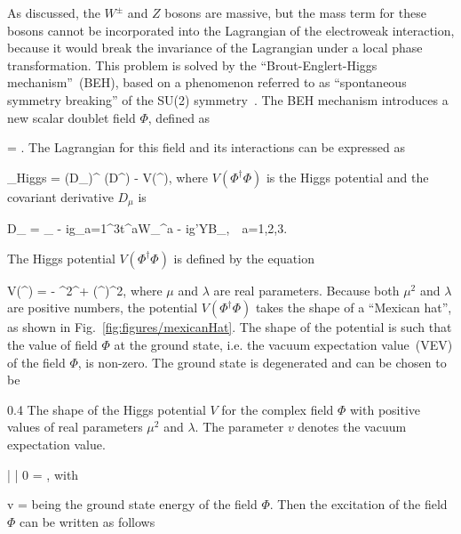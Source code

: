 As discussed, the $W^{\pm}$ and $Z$ bosons are massive, but the mass term for these bosons cannot be incorporated into the Lagrangian of the electroweak interaction, because it would break the invariance of the Lagrangian under a local phase transformation. This problem is solved by the ``Brout-Englert-Higgs mechanism''~(BEH), based on a phenomenon referred to as ``spontaneous symmetry breaking'' of the SU(2) symmetry~\cite{Englert:1964et, Guralnik:1964eu}. The BEH mechanism introduces a new scalar doublet field $\Phi$, defined as

{
    \Phi = .
}
The Lagrangian for this field and its interactions can be expressed as 

{
    _{Higgs} =  (D_{\mu}\Phi)^{\dagger} (D^{\mu}\Phi) - V(\Phi^{\dagger}\Phi),
}
where $V(\Phi^{\dagger}\Phi)$ is the Higgs potential and the covariant derivative $D_{\mu}$ is

{
   D_{\mu} = \partial_{\mu} - ig\sum_{a=1}^{3}t^{a}W_{\mu}^{a} - ig'YB_{\mu},~~a=1,2,3.
}

The Higgs potential $V(\Phi^{\dagger}\Phi)$ is defined by the equation

{
    V(\Phi^{\dagger}\Phi) =  -  \mu^{2}\Phi^{\dagger}\Phi +  \lambda(\Phi^{\dagger}\Phi)^{2},
}
where $\mu$ and $\lambda$ are real parameters. Because both $\mu^{2}$ and $\lambda$ are positive numbers, the potential $V(\Phi^{\dagger}\Phi)$ takes the shape of a ``Mexican hat'', as shown in Fig.~\ref{fig:figures/mexicanHat}. The shape of the potential is such that the value of field $\Phi$ at the ground state, i.e. the vacuum expectation value~(VEV) of the field $\Phi$, is non-zero. The ground state is degenerated and can be chosen to be

                 {0.4}       %
                 { The shape of the Higgs potential $V$ for the complex field $\Phi$ with positive values of real parameters $\mu^{2}$ and $\lambda$. The parameter $v$ denotes the vacuum expectation value.}

{
     | \Phi | 0 \rangle =  ,
}
with

{
v = 
}
being the ground state energy of the field $\Phi$. Then the excitation of the field $\Phi$ can be written as follows

